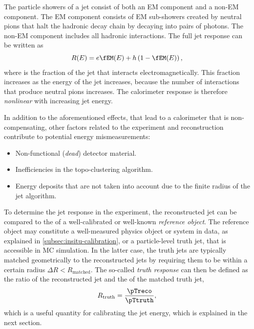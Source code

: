 The particle showers of a jet consist of both an EM component and a non-EM component. The EM component consists of EM sub-showers created by neutral pions that halt the hadronic decay chain by decaying into pairs of photons. The non-EM component includes all hadronic interactions.
The full jet response can be written as
\begin{equation}
    R(E) = e\fEM(E) + h\left(1 - \fEM(E)\right),
\end{equation}
where \fEM is the fraction of the jet that interacts electromagnetically. This fraction increases as the energy of the jet increases, because the number of interactions that produce neutral pions increases. The calorimeter response is therefore \emph{nonlinear} with increasing jet energy.

In addition to the aforementioned effects, that lead to a calorimeter that is non-compensating, other factors related to the experiment and reconstruction contribute to potential energy mismeasurements:
\begin{itemize}
    \item Non-functional (\emph{dead}) detector material.
    \item Inefficiencies in the topo-clustering algorithm.
    \item Energy deposits that are not taken into account due to the finite radius of the jet algorithm.
\end{itemize}

To determine the jet response in the experiment, the reconstructed jet \pT can be compared to the \pT of a well-calibrated or well-known \emph{reference object}. The reference object may constitute a well-measured physics object or system in data, as explained in \cref{subsec:insitu-calibration}, or a particle-level truth jet, that is accessible in MC simulation.
In the latter case, the truth jets are typically matched geometrically to the reconstructed jets by requiring them to be within a certain radius $\Delta R < R_{\text{matched}}$.
The so-called \emph{truth response} can then be defined as the ratio of the reconstructed jet \pT and the \pT of the matched truth jet,
\begin{equation}
    R_{\text{truth}} =  \frac{\pTreco}{\pTtruth},
\end{equation}
which is a useful quantity for calibrating the jet energy, which is explained in the next section.


